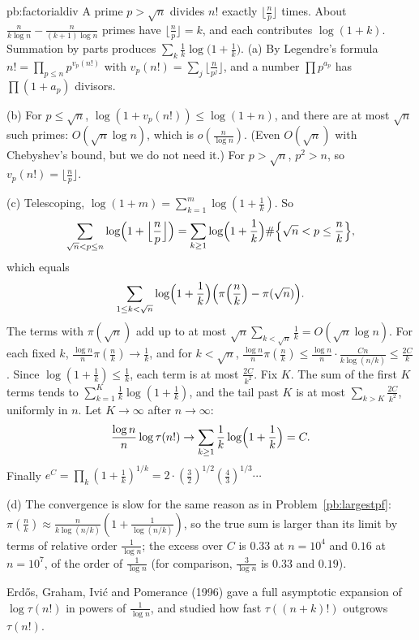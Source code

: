 \begin{solution}{pb:factorialdiv}
\idea A prime $p>\sqrt n$ divides $n!$ exactly $\lfloor\frac np\rfloor$ times. About $\frac n{k\log n}-\frac n{(k+1)\log n}$ primes have $\lfloor\frac np\rfloor=k$, and each contributes $\log(1+k)$. Summation by parts produces $\sum_k\frac1k\log\bigl(1+\frac1k\bigr)$.
\writeup (a) By Legendre's formula $n!=\prod_{p\le n}p^{v_p(n!)}$ with $v_p(n!)=\sum_j\lfloor\frac n{p^j}\rfloor$, and a number $\prod p^{a_p}$ has $\prod(1+a_p)$ divisors.

(b) For $p\le\sqrt n$, $\log(1+v_p(n!))\le\log(1+n)$, and there are at most $\sqrt n$ such primes: $O(\sqrt n\log n)$, which is $o(\frac n{\log n})$. (Even $O(\sqrt n)$ with
Chebyshev's bound, but we do not need it.) For $p>\sqrt n$, $p^2>n$, so $v_p(n!)=\lfloor\frac np\rfloor$.

(c) Telescoping, $\log(1+m)=\sum_{k=1}^m\log(1+\frac1k)$. So
\[
\sum_{\sqrt n<p\le n}\log\Bigl(1+\Bigl\lfloor\frac np\Bigr\rfloor\Bigr)=\sum_{k\ge1}\log\Bigl(1+\frac1k\Bigr)\#\Bigl\{\sqrt n<p\le\frac nk\Bigr\},
\]
which equals
\[
\sum_{1\le k<\sqrt n}\log\Bigl(1+\frac1k\Bigr)\Bigl(\pi\Bigl(\frac nk\Bigr)-\pi(\sqrt n)\Bigr).
\]
The terms with $\pi(\sqrt n)$ add up to at most $\sqrt n\sum_{k<\sqrt n}\frac1k=O(\sqrt n\log n)$. For each fixed $k$, $\frac{\log n}n\pi(\frac nk)\to\frac1k$, and for $k<\sqrt n$,
$\frac{\log n}n\pi(\frac nk)\le\frac{\log n}n\cdot\frac{Cn}{k\log(n/k)}\le\frac{2C}k$. Since $\log(1+\frac1k)\le\frac1k$, each term is at most $\frac{2C}{k^2}$. Fix $K$. The sum of the first $K$ terms tends to $\sum_{k=1}^K\frac1k\log(1+\frac1k)$, and the tail past $K$ is at most $\sum_{k>K}\frac{2C}{k^2}$, uniformly in $n$. Let $K\to\infty$ after $n\to\infty$:
\[
\frac{\log n}n\log\tau(n!)\to\sum_{k\ge1}\frac1k\log\Bigl(1+\frac1k\Bigr)=C.
\]
Finally $e^C=\prod_k(1+\frac1k)^{1/k}=2\cdot(\frac32)^{1/2}(\frac43)^{1/3}\cdots$

(d) The convergence is slow for the same reason as in Problem~\ref{pb:largestpf}: $\pi(\frac nk)\approx\frac n{k\log(n/k)}(1+\frac1{\log(n/k)})$, so the true sum is larger than its limit
by terms of relative order $\frac1{\log n}$; the excess over $C$ is $0.33$ at $n=10^4$ and $0.16$ at $n=10^7$, of the order of $\frac1{\log n}$ (for comparison, $\frac3{\log n}$ is $0.33$ and $0.19$).

\leads Erd\H os, Graham, Ivi\'c and Pomerance (1996) gave a full asymptotic expansion of $\log\tau(n!)$ in powers of $\frac1{\log n}$, and studied how fast $\tau((n+k)!)$ outgrows $\tau(n!)$.
\end{solution}


